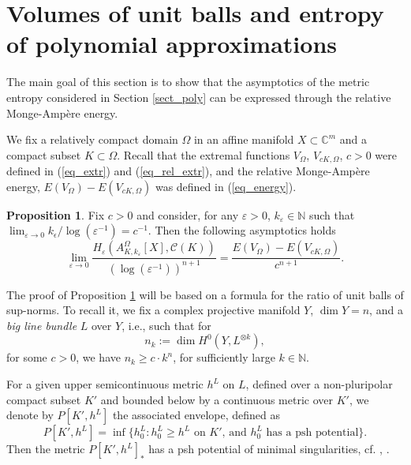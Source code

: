 \documentclass[12pt]{article}
\numberwithin{equation}{section}
\theoremstyle{theorem}
\theoremstyle{definition}
\newtheorem{prop}[thm]{Proposition}
\theoremstyle{remark}
\newcommand{\comp}{\mathbb{C}}
\newcommand{\nat}{\mathbb{N}}
\begin{document}
	\section{Volumes of unit balls and entropy of polynomial approximations}\label{sect_balls}
	The main goal of this section is to show that the asymptotics of the metric entropy considered in Section \ref{sect_poly} can be expressed through the relative Monge-Ampère energy.
	\par 
	We fix a relatively compact domain $\Omega$ in an affine manifold $X \subset \comp^m$ and a compact subset $K \subset \Omega$.
	Recall that the extremal functions $V_{\Omega}$, $V_{c K, \Omega}$, $c > 0$ were defined in (\ref{eq_extr}) and (\ref{eq_rel_extr}), and the relative Monge-Ampère energy, $E(V_{\Omega}) - E(V_{c K, \Omega})$ was defined in (\ref{eq_energy}).
	\begin{prop}\label{prop_pol_appr}
		Fix $c > 0$ and consider, for any $\varepsilon > 0$, $k_{\varepsilon} \in \nat$ such that $\lim_{\varepsilon \to 0} k_{\epsilon}/\log(\varepsilon^{-1}) = c^{-1}$.
		Then the following asymptotics holds
		\begin{equation}
			\lim_{\varepsilon \to 0}
			\frac{H_{\varepsilon}(A_{K, k_{\varepsilon}}^{\Omega}[X], \mathscr{C}(K))}{(\log (\varepsilon^{-1}))^{n + 1}}
			=
			\frac{E(V_{\Omega}) - E(V_{c K, \Omega})}{c^{n + 1}}.
		\end{equation}
	\end{prop}
	\par 
	The proof of Proposition \ref{prop_pol_appr} will be based on a formula for the ratio of unit balls of sup-norms.
	To recall it, we fix a complex projective manifold $Y$, $\dim Y = n$, and a \textit{big line bundle} $L$ over $Y$, i.e., such that for 
	\begin{equation}
		n_k := \dim H^0(Y, L^{\otimes k}),
	\end{equation}
	for some $c > 0$, we have $n_k \geq c \cdot k^n$, for sufficiently large $k \in \nat$.
	\par 
	For a given upper semicontinuous metric $h^L$ on $L$, defined over a non-pluripolar compact subset $K'$ and bounded below by a continuous metric over $K'$, we denote by $P[K', h^L]$ the associated envelope, defined as 
	\begin{equation}\label{eq_v_theta}
		P[K', h^L]
		=
		\inf \Big\{ 
			h^L_0 : h^L_0 \geq h^L \text{ on $K'$, and $h^L_0$ has a psh potential}
		\Big\}.
	\end{equation}	 
	Then the metric $P[K', h^L]_*$ has a psh potential of minimal singularities, cf. \cite{DemPluripot}, \cite[Proposition 2.2]{GuedjLuZeriahEnv}.
\end{document}
